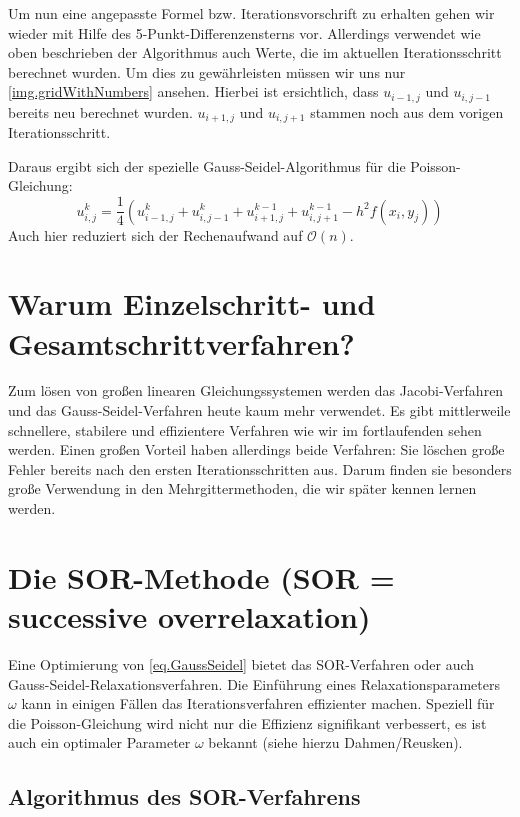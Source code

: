 Um nun eine angepasste Formel bzw. Iterationsvorschrift zu erhalten gehen wir wieder mit Hilfe des 5-Punkt-Differenzensterns vor. Allerdings verwendet wie oben beschrieben der Algorithmus auch Werte, die im aktuellen Iterationsschritt berechnet wurden. Um dies zu gewährleisten müssen wir uns nur \autoref{img.gridWithNumbers} ansehen. Hierbei ist ersichtlich, dass $u_{i-1,j}$ und $u_{i,j-1}$ bereits neu berechnet wurden. $u_{i+1,j}$ und $u_{i,j+1}$ stammen noch aus dem vorigen Iterationsschritt.

Daraus ergibt sich der spezielle Gauss-Seidel-Algorithmus für die Poisson-Gleichung:
\begin{equation}
u^{k}_{i,j} =   \frac {1} {4} (u^{k}_{i-1,j} + u^{k}_{i,j-1} + u^{k-1}_{i+1,j} + u^{k-1}_{i,j+1} - h^{2}f(x_{i},y_{j}))
\end{equation}
Auch hier reduziert sich der Rechenaufwand auf $\mathcal{O}(n)$.


\section{Warum Einzelschritt- und Gesamtschrittverfahren?}\label{s.Warum Einzelschritt- und Gesamtschrittverfahren?}
Zum lösen von großen linearen Gleichungssystemen werden das Jacobi-Verfahren und das Gauss-Seidel-Verfahren heute kaum mehr verwendet. Es gibt mittlerweile schnellere, stabilere und effizientere Verfahren wie wir im fortlaufenden sehen werden. Einen großen Vorteil haben allerdings beide Verfahren: Sie löschen große Fehler bereits nach den ersten Iterationsschritten aus. Darum finden sie besonders große Verwendung in den Mehrgittermethoden, die wir später kennen lernen werden.

\section{Die SOR-Methode (SOR = successive overrelaxation)}\label{s.SOR-Methode}

Eine Optimierung von \autoref{eq.GaussSeidel} bietet das SOR-Verfahren oder auch Gauss-Seidel-Relaxationsverfahren. Die Einführung eines Relaxationsparameters $\omega$ kann in einigen Fällen das Iterationsverfahren effizienter machen. Speziell für die Poisson-Gleichung wird nicht nur die Effizienz signifikant verbessert, es ist auch ein optimaler Parameter $\omega$ bekannt (siehe hierzu Dahmen/Reusken).

\subsection{Algorithmus des SOR-Verfahrens}\label{ss.Algorithmus des SOR-Verfahrens}

